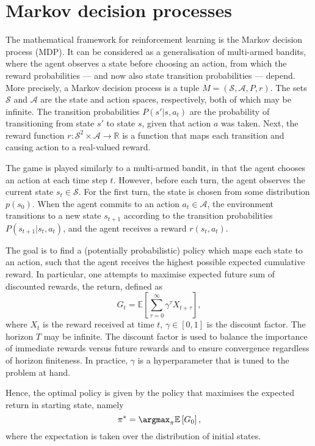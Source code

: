 \section{Markov decision processes}
The mathematical framework for reinforcement learning is the Markov decision process (MDP).
It can be considered as a generalisation of multi-armed bandits, where the agent observes a state before choosing an action, from which the reward probabilities — and now also state transition probabilities — depend.
More precisely, a Markov decision process is a tuple $M = (\mathcal{S}, \mathcal{A}, P, r)$.
The sets $\mathcal{S}$ and $\mathcal{A}$ are the state and action spaces, respectively, both of which may be infinite.
The transition probabilities $P(s' | s, a_t)$ are the probability of transitioning from state $s'$ to state $s$, given that action $a$ was taken.
Next, the reward function $r : \mathcal{S}^2 \times \mathcal{A} \to \mathbb{R}$ is a function that maps each transition and causing action to a real-valued reward.

The game is played similarly to a multi-armed bandit, in that the agent chooses an action at each time step $t$.
However, before each turn, the agent observes the current state $s_t \in \mathcal{S}$.
For the first turn, the state is chosen from some distribution $p(s_0)$.
When the agent commits to an action $a_t \in \mathcal{A}$, the environment transitions to a new state $s_{t+1}$ according to the transition probabilities $P(s_{t+1} | s_t, a_t)$, and the agent receives a reward $r(s_t, a_t)$.

The goal is to find a (potentially probabilistic) policy which maps each state to an action, such that the agent receives the highest possible expected cumulative reward.
In particular, one attempts to maximise expected future sum of discounted rewards, the return, defined as
\begin{equation}
    G_t = \mathbb{E} \left[ \sum_{\tau=0}^{\infty} \gamma^\tau X_{t+\tau} \right],
\end{equation}
where $X_t$ is the reward received at time $t$, $\gamma \in [0,1]$ is the discount factor. The horizon $T$ may be infinite.
The discount factor is used to balance the importance of immediate rewards versus future rewards and to ensure convergence regardless of horizon finiteness.
In practice, $\gamma$ is a hyperparameter that is tuned to the problem at hand.

Hence, the optimal policy is given by the policy that maximises the expected return in starting state, namely
\begin{equation}
    \pi^* = \argmax_{\pi} \mathbb{E} \left[ G_0 \right],
\end{equation}
where the expectation is taken over the distribution of initial states.

